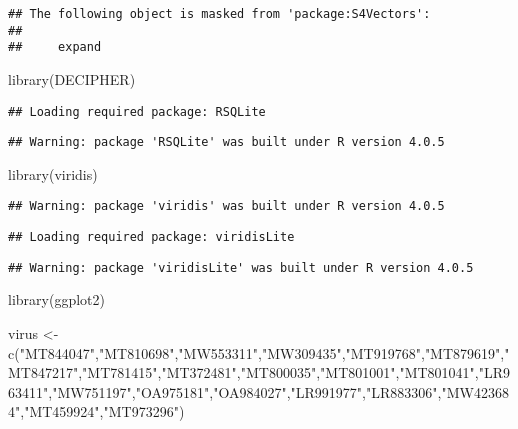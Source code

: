 \documentclass[
]{article}
\newenvironment{Shaded}{\begin{snugshade}}{\end{snugshade}}
\newcommand{\FunctionTok}[1]{\textcolor[rgb]{0.00,0.00,0.00}{#1}}
\newcommand{\NormalTok}[1]{#1}
\newcommand{\OtherTok}[1]{\textcolor[rgb]{0.56,0.35,0.01}{#1}}
\newcommand{\StringTok}[1]{\textcolor[rgb]{0.31,0.60,0.02}{#1}}
\begin{document}
\begin{verbatim}
## The following object is masked from 'package:S4Vectors':
## 
##     expand
\end{verbatim}

\begin{Shaded}
\begin{Highlighting}[]
\FunctionTok{library}\NormalTok{(DECIPHER)}
\end{Highlighting}
\end{Shaded}

\begin{verbatim}
## Loading required package: RSQLite
\end{verbatim}

\begin{verbatim}
## Warning: package 'RSQLite' was built under R version 4.0.5
\end{verbatim}

\begin{Shaded}
\begin{Highlighting}[]
\FunctionTok{library}\NormalTok{(viridis)}
\end{Highlighting}
\end{Shaded}

\begin{verbatim}
## Warning: package 'viridis' was built under R version 4.0.5
\end{verbatim}

\begin{verbatim}
## Loading required package: viridisLite
\end{verbatim}

\begin{verbatim}
## Warning: package 'viridisLite' was built under R version 4.0.5
\end{verbatim}

\begin{Shaded}
\begin{Highlighting}[]
\FunctionTok{library}\NormalTok{(ggplot2)}

\NormalTok{virus }\OtherTok{\textless{}{-}} \FunctionTok{c}\NormalTok{(}\StringTok{"MT844047"}\NormalTok{,}\StringTok{"MT810698"}\NormalTok{,}\StringTok{"MW553311"}\NormalTok{,}\StringTok{"MW309435"}\NormalTok{,}\StringTok{"MT919768"}\NormalTok{,}\StringTok{"MT879619"}\NormalTok{,}\StringTok{"MT847217"}\NormalTok{,}\StringTok{"MT781415"}\NormalTok{,}\StringTok{"MT372481"}\NormalTok{,}\StringTok{"MT800035"}\NormalTok{,}\StringTok{"MT801001"}\NormalTok{,}\StringTok{"MT801041"}\NormalTok{,}\StringTok{"LR963411"}\NormalTok{,}\StringTok{"MW751197"}\NormalTok{,}\StringTok{"OA975181"}\NormalTok{,}\StringTok{"OA984027"}\NormalTok{,}\StringTok{"LR991977"}\NormalTok{,}\StringTok{"LR883306"}\NormalTok{,}\StringTok{"MW423684"}\NormalTok{,}\StringTok{"MT459924"}\NormalTok{,}\StringTok{"MT973296"}\NormalTok{)}
\end{Highlighting}
\end{Shaded}
\end{document}
